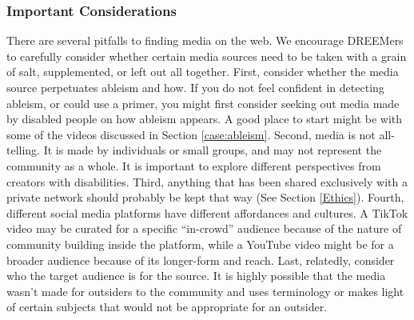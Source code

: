 
\subsubsection{Important Considerations}
There are several pitfalls to finding media on the web. We encourage DREEMers to carefully consider whether certain media sources need to be taken with a grain of salt, supplemented, or left out all together. First, consider whether the media source perpetuates ableism and how. If you do not feel confident in detecting ableism, or could use a primer, you might first consider seeking out media made by disabled people on how ableism appears. A good place to start might be with some of the videos discussed in Section \ref{case:ableism}. Second, media is not all-telling. It is made by individuals or small groups, and may not represent the community as a whole. It is important to explore different perspectives from creators with disabilities. Third, anything that has been shared exclusively with a private network should probably be kept that way (See Section \ref{Ethics}). Fourth, different social media platforms have different affordances and cultures. A TikTok video may be curated for a specific ``in-crowd'' audience because of the nature of community building inside the platform, while a YouTube video might be for a broader audience because of its longer-form and reach. Last, relatedly, consider who the target audience is for the source. It is highly possible that the media wasn't made for outsiders to the community and uses terminology or makes light of certain subjects that would not be appropriate for an outsider.

